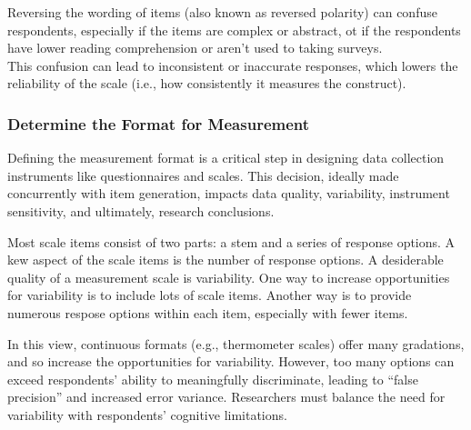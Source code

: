 \documentclass[
  letterpaper,
  DIV=11,
  numbers=noendperiod]{scrartcl}
\begin{document}
\begin{tcolorbox}[enhanced jigsaw, opacitybacktitle=0.6, toptitle=1mm, title=\textcolor{quarto-callout-caution-color}{\faFire}\hspace{0.5em}{Caution}, coltitle=black, colframe=quarto-callout-caution-color-frame, titlerule=0mm, breakable, left=2mm, bottomtitle=1mm, arc=.35mm, colback=white, rightrule=.15mm, colbacktitle=quarto-callout-caution-color!10!white, toprule=.15mm, opacityback=0, leftrule=.75mm, bottomrule=.15mm]

Reversing the wording of items (also known as reversed polarity) can
confuse respondents, especially if the items are complex or abstract, ot
if the respondents have lower reading comprehension or aren't used to
taking surveys.\\
This confusion can lead to inconsistent or inaccurate responses, which
lowers the reliability of the scale (i.e., how consistently it measures
the construct).

\end{tcolorbox}

\hypertarget{determine-the-format-for-measurement}{%
\subsubsection*{Determine the Format for
Measurement}\label{determine-the-format-for-measurement}}

Defining the measurement format is a critical step in designing data
collection instruments like questionnaires and scales. This decision,
ideally made concurrently with item generation, impacts data quality,
variability, instrument sensitivity, and ultimately, research
conclusions.

Most scale items consist of two parts: a stem and a series of response
options. A kew aspect of the scale items is the number of response
options. A desiderable quality of a measurement scale is variability.
One way to increase opportunities for variability is to include lots of
scale items. Another way is to provide numerous respose options within
each item, especially with fewer items.

In this view, continuous formats (e.g., thermometer scales) offer many
gradations, and so increase the opportunities for variability. However,
too many options can exceed respondents' ability to meaningfully
discriminate, leading to ``false precision'' and increased error
variance. Researchers must balance the need for variability with
respondents' cognitive limitations.
\end{document}
